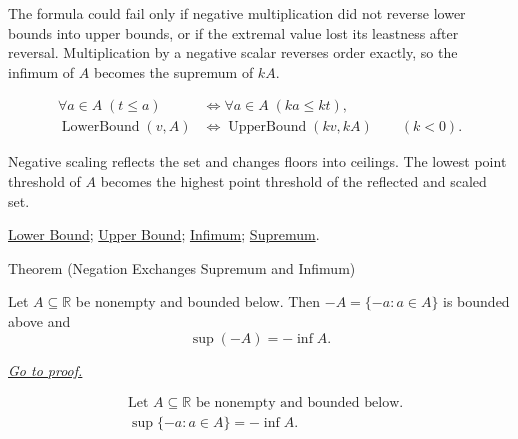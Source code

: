 \begin{remark*}
The formula could fail only if negative multiplication did not reverse lower bounds into upper bounds, or if the extremal value lost its leastness after reversal. Multiplication by a negative scalar reverses order exactly, so the infimum of $A$ becomes the supremum of $kA$.
\end{remark*}

\begin{remark*}
\[
\begin{aligned}
\forall a\in A\;(t\le a)
&\Longleftrightarrow
\forall a\in A\;(ka\le kt),\\
\operatorname{LowerBound}(v,A)
&\Longleftrightarrow
\operatorname{UpperBound}(kv,kA)
\qquad(k<0).
\end{aligned}
\]
\end{remark*}

\begin{remark*}[Interpretation]
Negative scaling reflects the set and changes floors into ceilings. The lowest point threshold of $A$ becomes the highest point threshold of the reflected and scaled set.
\end{remark*}

\begin{dependencies}
\hyperref[def:lower-bound]{Lower Bound};
\hyperref[def:upper-bound]{Upper Bound};
\hyperref[def:infimum]{Infimum};
\hyperref[def:supremum]{Supremum}.
\end{dependencies}


\begin{theorembox}{Theorem (Negation Exchanges Supremum and Infimum)}
\begin{theorem}
\label{thm:negation-exchange-sup-inf}
Let $A\subseteq\mathbb{R}$ be nonempty and bounded below. Then $-A=\{-a:a\in A\}$ is bounded above and
\[
  \sup(-A)=-\inf A.
\]

\smallskip
\noindent
\hyperref[prf:negation-exchange-sup-inf]{\textit{Go to proof.}}
\end{theorem}
\end{theorembox}

\begin{remark*}
\[
\begin{aligned}
&\text{Let }A\subseteq\mathbb{R}\text{ be nonempty and bounded below.}\\
&\sup\{-a:a\in A\}=-\inf A.
\end{aligned}
\]
\end{remark*}

